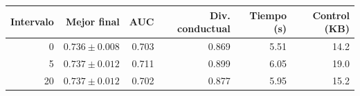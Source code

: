 \begin{tabular}{rrrrrr}
\toprule
Intervalo & Mejor final & AUC & Div. conductual & Tiempo (s) & Control (KB) \\
\midrule
0 & $0.736 \pm 0.008$ & 0.703 & 0.869 & 5.51 & 14.2 \\
5 & $0.737 \pm 0.012$ & 0.711 & 0.899 & 6.05 & 19.0 \\
20 & $0.737 \pm 0.012$ & 0.702 & 0.877 & 5.95 & 15.2 \\
\bottomrule
\end{tabular}
